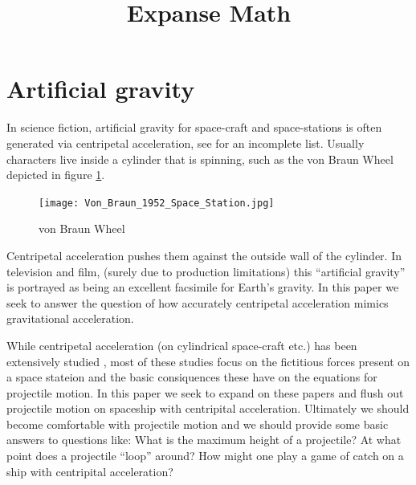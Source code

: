 \documentclass{amsart}
\title{Expanse Math}
\theoremstyle{definition}
\begin{document}
\maketitle

\section{Artificial gravity}

In science fiction, artificial gravity for space-craft and
space-stations is often generated via centripetal acceleration, see
\cite{2001,2010,missiontomars,themartian,expanse,babylon5,europareport,ringworld?,rama,intersetller,etc}
for an incomplete list. Usually characters live inside a cylinder that
is spinning, such as the von Braun Wheel depicted in figure
\ref{fig:Braun Wheel}.

\begin{figure}[h]
  \centering
  \texttt{[image: Von\_Braun\_1952\_Space\_Station.jpg]}
  \caption{von Braun Wheel}
  \label{fig:Braun Wheel}
\end{figure}

Centripetal acceleration pushes them against the outside wall of the
cylinder. In television and film, (surely due to production
limitations) this ``artificial gravity'' is portrayed as being an
excellent facsimile for Earth's gravity. In this paper we seek to
answer the question of how accurately centripetal acceleration mimics
gravitational acceleration.





While centripetal acceleration (on cylindrical space-craft etc.) has
been extensively studied \cite{papers,anotherpaper}, most of these
studies focus on the fictitious forces present on a space stateion and
the basic consiquences these have on the equations for projectile
motion. In this paper we seek to expand on these papers and flush out projectile motion on
spaceship with centripital acceleration. Ultimately we should become
comfortable with projectile motion and we should provide some basic
answers to questions like: What is the maximum height of a projectile?
At what point does a projectile ``loop'' around? How might one play a
game of catch on a ship with centripital acceleration?
\end{document}
